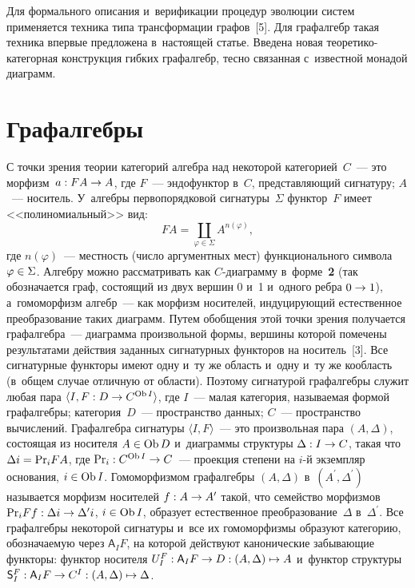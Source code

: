 \begin{multicols}{2}
     Для формального описания и~верификации процедур эволюции систем 
применяется техника типа трансформации графов~[5]. Для графалгебр такая 
техника впервые предложена в~на\-сто\-ящей статье. Введена новая тео\-ре\-ти\-ко-ка\-те\-гор\-ная конструкция гибких графалгебр, тес\-но связанная с~известной 
монадой диаграмм.

\vspace*{-6pt}
     
\section{Графалгебры}

\vspace*{-1pt}

     С точки зрения теории категорий алгебра над некоторой 
категорией~$C$~---  это морфизм~$a: FA \hm\to A$, где $F$~--- эндофунктор 
в~$C$, представляющий сигнатуру; $A$~--- носитель. У~алгебры 
первопорядковой сигнатуры~$\Sigma$ функтор~$F$ имеет 
<<полиномиальный>> вид: 
$$
FA=\coprod_{\varphi\in \Sigma}  
A^{n(\varphi)},
$$
 где $n(\varphi)$~--- мест\-ность (чис\-ло аргументных мест) 
функционального символа $\varphi\hm\in \Sigma$. Алгебру можно 
рас\-смат\-ри\-вать как $C$-диа\-грам\-му в~форме~\textbf{2} (так обозначается граф, 
со\-сто\-ящий из двух вершин 0 и~1 и~одного ребра $0\hm\to 1$), а~гомоморфизм 
алгебр~--- как морфизм носителей, индуцирующий естественное 
преобразование таких диаграмм. Путем обобщения этой точки зрения 
получается графалгебра~--- диаграмма произвольной формы, вершины которой 
помечены результатами действия заданных сигнатурных функторов на 
носитель~[3]. Все сигнатурные функторы имеют одну и~ту же об\-ласть и~одну 
и~ту же ко\-об\-ласть (в~общем случае отличную от об\-ласти). Поэтому сигнатурой 
графалгебры служит любая пара $\langle I, F : D \hm\to C^{\mathrm{Ob}\,I}\rangle$, 
где $I$~--- малая категория, называемая формой граф\-ал\-геб\-ры; категория~$D$~--- 
пространство данных; $C$~--- пространство вы\-чис\-ле\-ний. 
Графалгебра сигнатуры $\langle I, F\rangle$~--- это произвольная пара $(A, 
\Delta)$, состоящая из носителя $A\hm\in \mathrm{Ob}\,D$ и~диаграммы 
структуры $\Delta  : I \hm\to C$, такая что $\Delta i \hm= \mathrm{Pr}_iFA$, где $\mathrm{Pr}_i : 
C^{\mathrm{Ob}\,I} \hm\to C$~--- проекция степени на $i$-й экземп\-ляр основания, $i 
\hm\in \mathrm{Ob}\,I$. Гомоморфизмом графалгебры $(A, \Delta)$ 
в~$(A^\prime, \Delta^\prime)$ называется морфизм носителей $f : A\hm\to  
A^\prime$ такой, что семейство морфизмов $\mathrm{Pr}_iFf : \Delta i \hm\to  
\Delta^\prime i$, $i \hm\in \mathrm{Ob}\,I$, образует естественное 
преобразование~$\Delta$ в~$\Delta^\prime$. Все графалгебры некоторой 
сигнатуры и~все их гомоморфизмы образуют категорию, обозначаемую через 
$\mathsf {A}_I F$, на которой действуют канонические за\-бы\-ва\-ющие 
функторы: функтор носителя $U_I^F : \mathsf {A}_IF \hm\to  D : (A, \Delta) 
\hm\mapsto A$ и~функтор структуры $\mathsf {S}_I^F : \mathsf {A}_IF \hm\to 
C^I : (A, \Delta) \hm\mapsto \Delta$.
     

\end{multicols}
